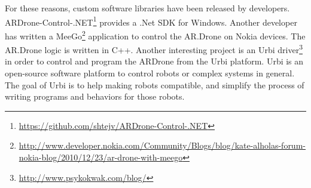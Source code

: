 For these reasons, custom software libraries have been released by developers.
ARDrone-Control-.NET\footnote{\url{https://github.com/shtejv/ARDrone-Control-.NET}} provides a .Net SDK for Windows.
Another developer has written a MeeGo\footnote{\url{http://www.developer.nokia.com/Community/Blogs/blog/kate-alholas-forum-nokia-blog/2010/12/23/ar-drone-with-meego}} application to control the AR.Drone on Nokia devices. The AR.Drone logic is written in C++.
Another interesting project is an Urbi driver\footnote{\url{http://www.psykokwak.com/blog/}} in order to control and program the ARDrone from the Urbi platform.
Urbi is an open-source software platform to control robots or complex systems in general. The goal of Urbi is to help making robots compatible, and simplify the process of writing programs and behaviors for those robots. 